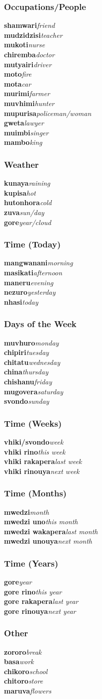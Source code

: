 \documentclass[12pt]{article}
\newcommand{\dw}[2]{\textbf{#1}\hspace{1em}\textit{#2}\\}
\begin{document}
\begin{multicols}{2}
\subsubsection{Occupations/People}
\dw{shamwari}{friend}
\dw{mudzidzisi}{teacher}
\dw{mukoti}{nurse}
\dw{chiremba}{doctor}
\dw{mutyairi}{driver}
\dw{moto}{fire}
\dw{mota}{car}
\dw{murimi}{farmer}
\dw{muvhimi}{hunter}
\dw{mupurisa}{policeman/woman}
\dw{gweta}{lawyer}
\dw{muimbi}{singer}
\dw{mambo}{king}

\subsubsection{Weather}
\dw{kunaya}{raining}
\dw{kupisa}{hot}
\dw{hutonhora}{cold}
\dw{zuva}{sun/day}
\dw{gore}{year/cloud}

\subsubsection{Time (Today)}
\dw{mangwanani}{morning}
\dw{masikati}{afternoon}
\dw{maneru}{evening}
\dw{nezuro}{yesterday}
\dw{nhasi}{today}

\subsubsection{Days of the Week}
\dw{muvhuro}{monday}
\dw{chipiri}{tuesday}
\dw{chitatu}{wednesday}
\dw{china}{thursday}
\dw{chishanu}{friday}
\dw{mugovera}{saturday}
\dw{svondo}{sunday}

\subsubsection{Time (Weeks)}
\dw{vhiki/svondo}{week}
\dw{vhiki rino}{this week}
\dw{vhiki rakapera}{last week}
\dw{vhiki rinouya}{next week}

\subsubsection{Time (Months)}
\dw{mwedzi}{month}
\dw{mwedzi uno}{this month}
\dw{mwedzi wakapera}{last month}
\dw{mwedzi unouya}{next month}

\subsubsection{Time (Years)}
\dw{gore}{year}
\dw{gore rino}{this year}
\dw{gore rakapera}{last year}
\dw{gore rinouya}{next year}

\subsubsection{Other}
\dw{zororo}{break}
\dw{basa}{work}
\dw{chikoro}{school}
\dw{chitoro}{store}
\dw{maruva}{flowers}



\end{multicols}
\end{document}
